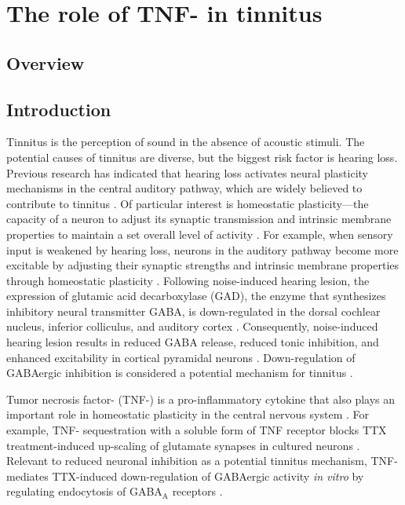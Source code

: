 \chapter{The role of TNF-\textalpha{} in tinnitus}

\section{Overview}

\newrefsection

\section{Introduction}
Tinnitus is the perception of sound in the absence of acoustic stimuli. The potential causes of tinnitus are diverse, but the biggest risk factor is hearing loss. Previous research has indicated that hearing loss activates neural plasticity mechanisms in the central auditory pathway, which are widely believed to contribute to tinnitus \cite{Roberts2010}. Of particular interest is homeostatic plasticity---the capacity of a neuron to adjust its synaptic transmission and intrinsic membrane properties to maintain a set overall level of activity \cite{Turrigiano1999, Davis2001}. For example, when sensory input is weakened by hearing loss, neurons in the auditory pathway become more excitable by adjusting their synaptic strengths and intrinsic membrane properties through homeostatic plasticity \cite{Kotak2005, Yang2011a, Yang2012}. Following noise-induced hearing lesion, the expression of glutamic acid decarboxylase (GAD), the enzyme that synthesizes inhibitory neural transmitter GABA, is down-regulated in the dorsal cochlear nucleus, inferior colliculus, and auditory cortex \cite{Abbott1999, Milbrandt2000, Yang2011a, Browne2012}. Consequently, noise-induced hearing lesion results in reduced GABA release, reduced tonic inhibition, and enhanced excitability in cortical pyramidal neurons \cite{Yang2011a, Yang2012}. Down-regulation of GABAergic inhibition is considered a potential mechanism for tinnitus \cite{Yang2011a, Llano2012}.

Tumor necrosis factor-\textalpha{} (TNF-\textalpha{}) is a pro-inflammatory cytokine that also plays an important role in homeostatic plasticity in the central nervous system \cite{Stellwagen2005, Stellwagen2006, Steinmetz2010, Wang2011}. For example, TNF-\textalpha{} sequestration with a soluble form of TNF receptor blocks TTX treatment-induced up-scaling of glutamate synapses in cultured neurons \cite{Stellwagen2006, Steinmetz2010}. Relevant to reduced neuronal inhibition as a potential tinnitus mechanism, TNF-\textalpha{} mediates TTX-induced down-regulation of GABAergic activity \textit{in vitro} by regulating endocytosis of GABA$_\mathrm{A}$ receptors \cite{Stellwagen2005, Stellwagen2006}.

